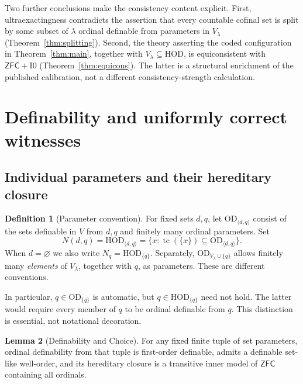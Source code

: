 \documentclass[11pt,letterpaper]{article}
\theoremstyle{definition}
\newtheorem{definition}{Definition}[section]
\newtheorem{lemma}[definition]{Lemma}
\newcommand{\ZFC}{\mathsf{ZFC}}
\newcommand{\OD}{\mathrm{OD}}
\newcommand{\HOD}{\mathrm{HOD}}
\newcommand{\tc}{\operatorname{tc}}
\newcommand{\Izero}{\mathrm I0}
\newcommand{\Npar}[2]{\HOD_{\langle #1,#2\rangle}}
\newcommand{\ODpar}[2]{\OD_{\langle #1,#2\rangle}}
\begin{document}
Two further conclusions make the consistency content explicit. First, ultraexactingness contradicts the assertion that every countable cofinal set is split by some subset of $\lambda$ ordinal definable from parameters in $V_\lambda$ (Theorem~\ref{thm:splitting}). Second, the theory asserting the coded configuration in Theorem~\ref{thm:main}, together with $V_\lambda\subseteq\HOD$, is equiconsistent with $\ZFC+\Izero$ (Theorem~\ref{thm:equicons}). The latter is a structural enrichment of the published calibration, not a different consistency-strength calculation.

\section{Definability and uniformly correct witnesses}\label{sec:definability}

\subsection{Individual parameters and their hereditary closure}

\begin{definition}[Parameter convention]\label{def:hod}
For fixed sets $d,q$, let $\ODpar dq$ consist of the sets definable in $V$ from $d,q$ and finitely many ordinal parameters. Set
\[
 N(d,q)=\Npar dq
       =\{x:\tc(\{x\})\subseteq\ODpar dq\}.
\]
When $d=\varnothing$ we also write $N_q=\HOD_{\{q\}}$. Separately, $\OD_{V_\lambda\cup\{q\}}$ allows finitely many \emph{elements} of $V_\lambda$, together with $q$, as parameters. These are different conventions.
\end{definition}

In particular, $q\in\OD_{\{q\}}$ is automatic, but $q\in\HOD_{\{q\}}$ need not hold. The latter would require every member of $q$ to be ordinal definable from $q$. This distinction is essential, not notational decoration.

\begin{lemma}[Definability and Choice]\label{lem:hod}
For any fixed finite tuple of set parameters, ordinal definability from that tuple is first-order definable, admits a definable set-like well-order, and its hereditary closure is a transitive inner model of $\ZFC$ containing all ordinals.
\end{lemma}
\end{document}
